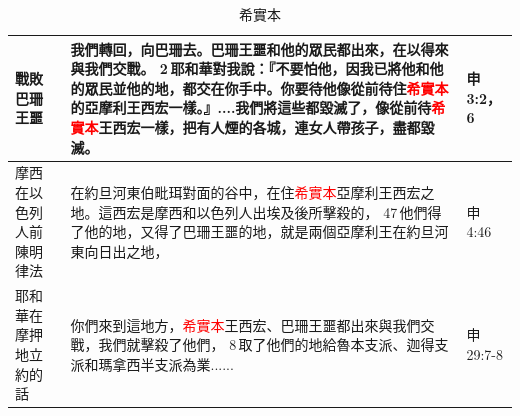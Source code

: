 \begin{table}[H]
\begin{tabular}{p{}|p{14cm}|p{1.5cm}}
戰敗巴珊王噩&我們轉回，向巴珊去。巴珊王噩和他的眾民都出來，在以得來與我們交戰。 2 耶和華對我說：『不要怕他，因我已將他和他的眾民並他的地，都交在你手中。你要待他像從前待住\textcolor{red}{希實本}的亞摩利王西宏一樣。』....我們將這些都毀滅了，像從前待\textcolor{red}{希實本}王西宏一樣，把有人煙的各城，連女人帶孩子，盡都毀滅。&申3:2，6\\\hline
摩西在以色列人前陳明律法&在約旦河東伯毗珥對面的谷中，在住\textcolor{red}{希實本}亞摩利王西宏之地。這西宏是摩西和以色列人出埃及後所擊殺的， 47 他們得了他的地，又得了巴珊王噩的地，就是兩個亞摩利王在約旦河東向日出之地，&申4:46\\\hline
耶和華在摩押地立約的話&你們來到這地方，\textcolor{red}{希實本}王西宏、巴珊王噩都出來與我們交戰，我們就擊殺了他們， 8 取了他們的地給魯本支派、迦得支派和瑪拿西半支派為業......&申29:7-8\\\hline
\end{tabular}
\caption{希實本}
\end{table}


